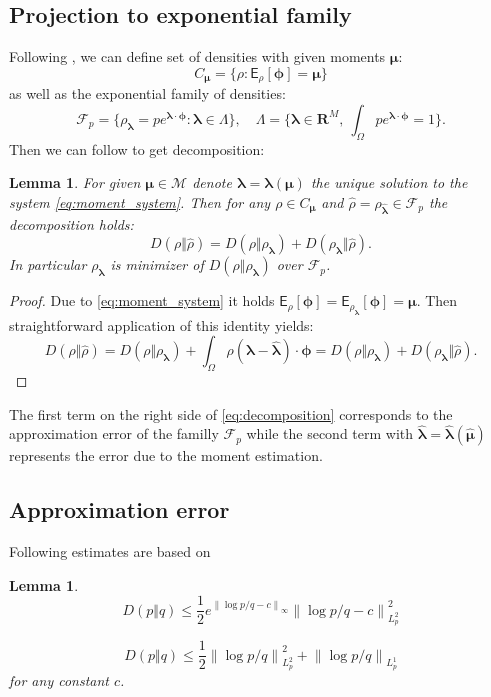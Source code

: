 \documentclass{article}
\newtheorem{lemma}[theorem]{Lemma}
\def\vc#1{\mathbf{\boldsymbol{#1}}}     %
\def \E{{\mathsf E}}
\newcommand{\norm}[1]{\left\lVert#1\right\rVert}
\def\R{\mathbf{R}}
\def\vl{{\vc\lambda}}
\def\estvl{{\vc{\hat\lambda}}}
\def\estrho{\hat\rho}
\def\vmu{\vc\mu}
\def\estvmu{{\vc{\hat\mu}}}
\def\vphi{\vc\phi}
\begin{document}
\subsection{Projection to exponential family}

Following \cite{Barron1991}, we can define set of densities with given moments $\vmu$:
\[
    C_{\vmu} = \{ \rho : \E_\rho[\vphi] = \vmu \}
\]
as well as the exponential family of densities:
\[
    \mathcal F_{p} = \{ \rho_\vl = 
    p e^{\vl\cdot\vphi} :
    \vl \in \Lambda\},\quad \Lambda = 
    \{\vl\in\R^M,\ \int_\Omega p e^{\vl\cdot\vphi} = 1\}.
\]
Then we can follow \cite[Lemma 2]{Barron1991} to get decomposition:
\begin{lemma}
\label{thm:decomposition}
For given $\vmu \in \mathcal M$ denote $\vl =\vl(\vmu)$ the unique solution to the system \eqref{eq:moment_system}. Then for any $\rho \in C_{\vmu}$ and $\estrho=\rho_\estvl \in\mathcal F_p$ the decomposition holds:
\begin{equation}
    \label{eq:decomposition}
    D(\rho\Vert\estrho) = D(\rho\Vert\rho_{\vl}) + D(\rho_{\vl}\Vert
    \estrho).
\end{equation}
In particular $\rho_{\vl}$ is minimizer of $D(\rho\Vert\rho_{\vl})$ over $\mathcal F_p$.
\end{lemma}
\begin{proof}
Due to \eqref{eq:moment_system} it holds $\E_{\rho}[\vphi] = \E_{\rho_{\vl}}[\vphi] = \vmu$. Then straightforward application of this identity yields:
\[
 D(\rho\Vert\estrho) = D(\rho\Vert\rho_{\vl}) 
 + \int_\Omega \rho (\vl - \estvl)\cdot \vc \phi = D(\rho\Vert\rho_{\vl}) + D(\rho_{\vl}\Vert\estrho).
\]
\end{proof}
The first term  on the right side of \eqref{eq:decomposition} corresponds to the approximation error of the familly $\mathcal F_p$ while the second term with $\estvl = \estvl(\estvmu)$ represents the error due to the moment estimation. 

\subsection{Approximation error}
Following estimates are based on \cite[Lemma 2]{Barron1991} 
\begin{lemma} 
  \begin{equation}
      \label{eq:l2_estimate}
      D(p\Vert q) \le \frac{1}{2}e^{\norm{\log p/q - c}_\infty} \norm{\log p/ q - c}_{L^2_p}^2
  \end{equation}

  
  \begin{equation}
      \label{eq:l1_estimate}
      D(p\Vert q) \le \frac{1}{2}\norm{\log p/ q}^2_{L^2_p} + \norm{\log p/ q}_{L^1_p}
  \end{equation}
 for any constant $c$.
\end{lemma}
\end{document}
